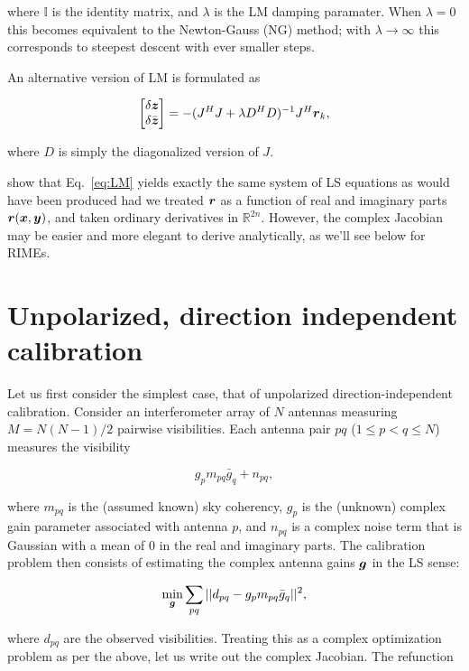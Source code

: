 \documentclass[useAMS,usenatbib]{mn2e}
\newcommand{\RR}{\mathbb{R}}
\newcommand{\II}{\mathbb{I}}
\newcommand{\zz}{\bmath{z}}
\newcommand{\JJ}{J} %
\begin{document}
where $\II$ is the identity matrix, and $\lambda$ is the LM damping paramater. When $\lambda=0$ this becomes 
equivalent to the Newton-Gauss (NG) method; with $\lambda\to\infty$ this corresponds to steepest descent with ever smaller steps.

An alternative version of LM is formulated as

\begin{equation}
\label{eq:LM1}
\Matrix{c}{\delta \zz \\ \delta \bar{\zz}} = -(\JJ^H \JJ + \lambda D^H D)^{-1}\JJ^H \bmath{r}_k,
\end{equation}

where $D$ is simply the diagonalized version of $J$.

\citet{ComplexOpt} show that Eq.~\ref{eq:LM} yields exactly the same system of LS equations as would have 
been produced had we treated $\bmath{r}$ as a function of real and imaginary parts $\bmath{r}(\bmath{x},\bmath{y})$, 
and taken ordinary derivatives in $\RR^{2n}$. However, the complex Jacobian may be easier and more elegant 
to derive analytically, as we'll see below for RIMEs.

\section{Unpolarized, direction independent calibration}

Let us first consider the simplest case, that of unpolarized direction-independent calibration. Consider an interferometer
array of $N$ antennas measuring $M=N(N-1)/2$ pairwise visibilities. Each antenna pair $pq$ ($1\leq p<q\leq N$) 
measures the visibility

\begin{equation}
\label{eq:RIME:unpol}
g_p m_{pq} \bar{g}_q + n_{pq},
\end{equation}

where $m_{pq}$ is the (assumed known) sky coherency, $g_p$ is the (unknown) complex gain parameter 
associated with antenna $p$, and $n_{pq}$ is a complex noise term that is Gaussian with a mean of 0 in the real and 
imaginary parts. The calibration problem then consists of estimating the complex antenna gains $\bmath{g}$ in the LS sense:

\begin{equation}
\label{eq:cal:DI}
\min_{\bmath{g}}\sum_{pq}||d_{pq}-g_p m_{pq} \bar{g}_q||^2, 
\end{equation}

where $d_{pq}$ are the observed visibilities. Treating this as a complex optimization problem as per the above, 
let us write out the complex Jacobian. The refunction
\end{document}

